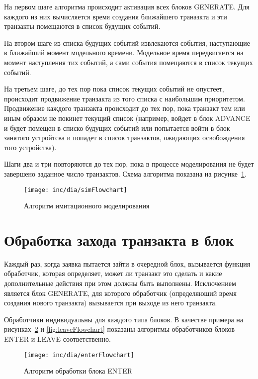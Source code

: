 На первом шаге алгоритма происходит активация всех блоков GENERATE. Для каждого из них вычисляется время создания ближайшего траназкта и эти транзакты помещаются в список будущих событий.

На втором шаге из списка будущих событий извлекаются события, наступающие в ближайший момент модельного времени. Модельное время передвигается на момент наступления тих событий, а сами события помещаются в  список текущих событий. 

На третьем шаге, до тех пор пока список текущих событий не опустеет, происходит продвижение транзакта из того списка с наибольшим приоритетом. Продвижение каждого транзакта происходит до тех пор, пока транзакт тем или иным образом не покинет текущий список (например, войдет в блок ADVANCE и будет помещен в списко будущих событий или попытается войти в блок занятого устройтсва и попадет в список транзактов, ожидающих освобождения того устройства).

Шаги два и три повторяются до тех пор, пока в процессе моделирования не будет завершено заданное число транзактов. Схема алгоритма показана на рисунке~\ref{fig:simFlowchart}.

\begin{figure}[ht]
  \centering
  \texttt{[image: inc/dia/simFlowchart]}
  \caption{Алгоритм имитационного моделирования}
  \label{fig:simFlowchart}
\end{figure}


\section{Обработка захода транзакта в блок}

Каждый раз, когда заявка пытается зайти в очередной блок, вызывается функция обработчик, которая определяет, может ли транзакт это сделать и какие дополнительные действия при этом должны быть выполнены. Исключением является блок GENERATE, для которого обработчик (определяющий время создания нового транзакта) вызывается при выходе из него транзакта. 

Обработчики индивидуальны для каждого типа блоков. В качестве примера на рисунках~\ref{fig:enterFlowchart} и \ref{fig:leaveFlowchart} показаны алгоритмы обработчиков блоков ENTER и LEAVE соответственно.

\begin{figure}[ht]
  \centering
  \texttt{[image: inc/dia/enterFlowchart]}
  \caption{Алгоритм обработки блока ENTER}
  \label{fig:enterFlowchart}
\end{figure}

